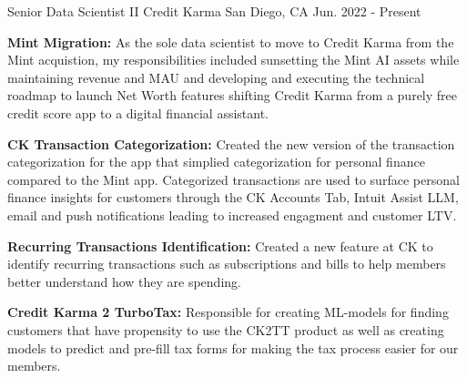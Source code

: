 


\begin{cventries}




\cventry
    {Senior Data Scientist II} %
    {Credit Karma} %
    {San Diego, CA} %
    {Jun. 2022 - Present} %
    {\begin{cvitems}
        \setlength\itemsep{.15em}
        \item { \textbf{Mint Migration: } As the sole data scientist to move to Credit Karma from the Mint acquistion, my responsibilities included sunsetting the Mint AI assets while maintaining revenue and MAU and developing and executing the technical roadmap  to launch Net Worth features  shifting Credit Karma from a purely free credit score app to a digital financial assistant.  }
        \item { \textbf{CK Transaction Categorization: } Created the new version of the transaction categorization for the app that simplied categorization for personal finance compared to the Mint app. Categorized transactions are used to surface personal finance insights for customers through the CK Accounts Tab, Intuit Assist LLM, email and push notifications leading to increased engagment and customer LTV.}
         \item { \textbf{Recurring Transactions Identification: } Created a new feature at CK to identify recurring transactions such as subscriptions and bills to help members better understand how they are spending.}
         \item { \textbf{Credit Karma 2 TurboTax:} Responsible for creating ML-models for finding customers that have propensity to use the CK2TT product as well as creating models to predict and pre-fill tax forms for making the tax process easier for our members. }
     \end{cvitems}}



\end{cventries}
